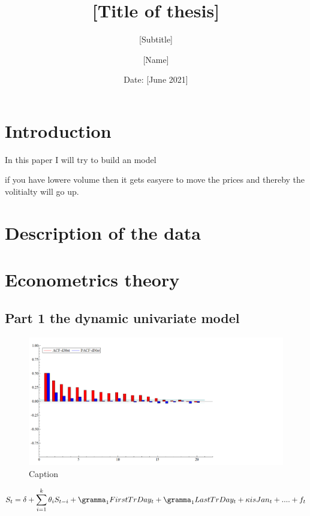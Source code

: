 \documentclass[12pt]{article}
\author{[Name]}
\title{[Title of thesis]}
\subtitle{[Subtitle]}
\date{Date: {[June 2021]}}
\begin{document}
\maketitle

\onehalfspacing


\tableofcontents
\newpage

{\selectfont

\section{Introduction}

In this paper I will try to build an model 

if you have lowere volume then it gets easyere to move the prices and thereby the volitialty will go up. 

\section{Description of the data}

\section{Econometrics  theory}

\subsection{Part 1 the dynamic univariate model}

\begin{figure}[h!]
    \centering
    \includegraphics[scale=0.3]{Figure/AFC_model_1.png}
    \caption{Caption}
    \label{fig:my_label}
\end{figure}

\begin{equation}
    S_t = \delta + \sum_{i=1}^{k} \theta_i S_{t-i} + \gramma_1 FirstTrDay_t + \gramma_1 LastTrDay_t + \kappa isJan_t + .... + f_t
\end{equation}

}
\end{document}
